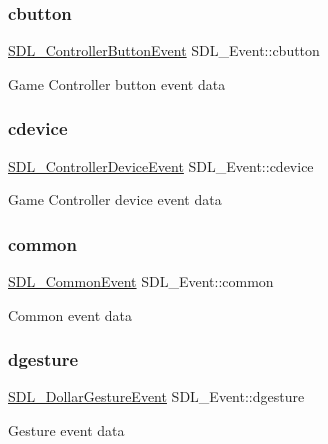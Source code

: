 \subsubsection{\texorpdfstring{cbutton}{cbutton}}
{\footnotesize\ttfamily \hyperlink{structSDL__ControllerButtonEvent}{S\+D\+L\+\_\+\+Controller\+Button\+Event} S\+D\+L\+\_\+\+Event\+::cbutton}

Game Controller button event data \mbox{\label{unionSDL__Event_ad3beed01e690b885728e0b0e1d636378}} 
\subsubsection{\texorpdfstring{cdevice}{cdevice}}
{\footnotesize\ttfamily \hyperlink{structSDL__ControllerDeviceEvent}{S\+D\+L\+\_\+\+Controller\+Device\+Event} S\+D\+L\+\_\+\+Event\+::cdevice}

Game Controller device event data \mbox{\label{unionSDL__Event_abe5cb8767f93de55163c8ddd4562a7f2}} 
\subsubsection{\texorpdfstring{common}{common}}
{\footnotesize\ttfamily \hyperlink{structSDL__CommonEvent}{S\+D\+L\+\_\+\+Common\+Event} S\+D\+L\+\_\+\+Event\+::common}

Common event data \mbox{\label{unionSDL__Event_a4481167b9f8549aeb254e97ca812e74d}} 
\subsubsection{\texorpdfstring{dgesture}{dgesture}}
{\footnotesize\ttfamily \hyperlink{structSDL__DollarGestureEvent}{S\+D\+L\+\_\+\+Dollar\+Gesture\+Event} S\+D\+L\+\_\+\+Event\+::dgesture}

Gesture event data \mbox{\label{unionSDL__Event_afe513d46e191a9791988b9adab705ef6}} 
